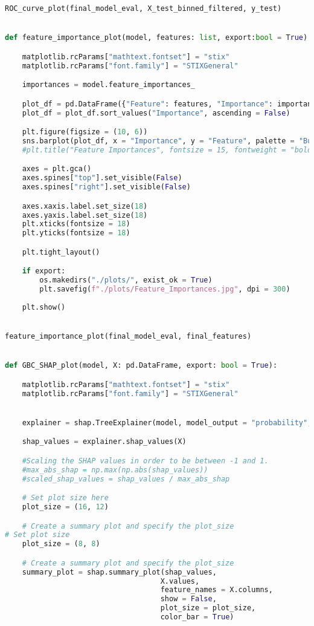 \begin{lstlisting}[language=Python, basicstyle=\footnotesize\ttfamily]
ROC_curve_plot(final_model_eval, X_test_binned_filtered, y_test)


def feature_importance_plot(model, features: list, export:bool = True):

    matplotlib.rcParams["mathtext.fontset"] = "stix"
    matplotlib.rcParams["font.family"] = "STIXGeneral"

    importances = model.feature_importances_

    plot_df = pd.DataFrame({"Feature": features, "Importance": importances})
    plot_df = plot_df.sort_values("Importance", ascending = False)

    plt.figure(figsize = (10, 6))
    sns.barplot(plot_df, x = "Importance", y = "Feature", palette = "BuPu_r")
    #plt.title("Feature Importances", fontsize = 15, fontweight = "bold")

    axes = plt.gca()
    axes.spines["top"].set_visible(False)
    axes.spines["right"].set_visible(False)

    axes.xaxis.label.set_size(18)
    axes.yaxis.label.set_size(18)
    plt.xticks(fontsize = 18)
    plt.yticks(fontsize = 18)

    plt.tight_layout()

    if export:
        os.makedirs("./plots/", exist_ok = True)
        plt.savefig(f"./plots/Feature_Importances.jpg", dpi = 300)
        
    plt.show()


feature_importance_plot(final_model_eval, final_features)


def GBC_SHAP_plot(model, X: pd.DataFrame, export: bool = True):

    matplotlib.rcParams["mathtext.fontset"] = "stix"
    matplotlib.rcParams["font.family"] = "STIXGeneral"


    explainer = shap.TreeExplainer(model, model_output = "probability", data = X)

    shap_values = explainer.shap_values(X)

    #Scaling the SHAP values in order to be between -1 and 1.
    #max_abs_shap = np.max(np.abs(shap_values))
    #scaled_shap_values = shap_values / max_abs_shap

    # Set plot size here
    plot_size = (16, 12)

    # Create a summary plot and specify the plot_size
# Set plot size
    plot_size = (8, 8)

    # Create a summary plot and specify the plot_size
    summary_plot = shap.summary_plot(shap_values,
                                    X.values,
                                    feature_names = X.columns,
                                    show = False,
                                    plot_size = plot_size,
                                    color_bar = True)


\end{lstlisting}
